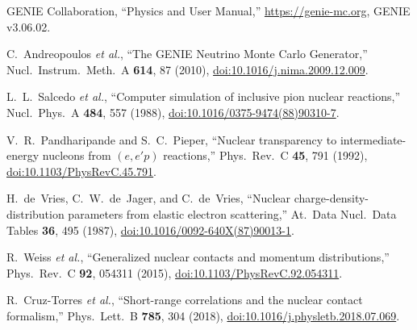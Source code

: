 \documentclass[11pt,a4paper]{article}
\begin{document}
\begin{enumerate}[label={[\arabic*]}]
  \item GENIE Collaboration, ``Physics and User Manual,''
        \url{https://genie-mc.org}, GENIE v3.06.02.
  \item C.~Andreopoulos \textit{et al.},
        ``The GENIE Neutrino Monte Carlo Generator,''
        Nucl.\ Instrum.\ Meth.\ A \textbf{614}, 87 (2010),
        \href{https://doi.org/10.1016/j.nima.2009.12.009}{doi:10.1016/j.nima.2009.12.009}.
  \item L.~L.~Salcedo \textit{et al.},
        ``Computer simulation of inclusive pion nuclear reactions,''
        Nucl.\ Phys.\ A \textbf{484}, 557 (1988),
        \href{https://doi.org/10.1016/0375-9474(88)90310-7}{doi:10.1016/0375-9474(88)90310-7}.
  \item V.~R.~Pandharipande and S.~C.~Pieper,
        ``Nuclear transparency to intermediate-energy nucleons from
        $(e,e'p)$ reactions,''
        Phys.\ Rev.\ C \textbf{45}, 791 (1992),
        \href{https://doi.org/10.1103/PhysRevC.45.791}{doi:10.1103/PhysRevC.45.791}.
  \item H.~de~Vries, C.~W.~de~Jager, and C.~de~Vries,
        ``Nuclear charge-density-distribution parameters from elastic
        electron scattering,''
        At.\ Data Nucl.\ Data Tables \textbf{36}, 495 (1987),
        \href{https://doi.org/10.1016/0092-640X(87)90013-1}{doi:10.1016/0092-640X(87)90013-1}.
  \item R.~Weiss \textit{et al.},
        ``Generalized nuclear contacts and momentum distributions,''
        Phys.\ Rev.\ C \textbf{92}, 054311 (2015),
        \href{https://doi.org/10.1103/PhysRevC.92.054311}{doi:10.1103/PhysRevC.92.054311}.
  \item R.~Cruz-Torres \textit{et al.},
        ``Short-range correlations and the nuclear contact formalism,''
        Phys.\ Lett.\ B \textbf{785}, 304 (2018),
        \href{https://doi.org/10.1016/j.physletb.2018.07.069}{doi:10.1016/j.physletb.2018.07.069}.
\end{enumerate}
\end{document}
